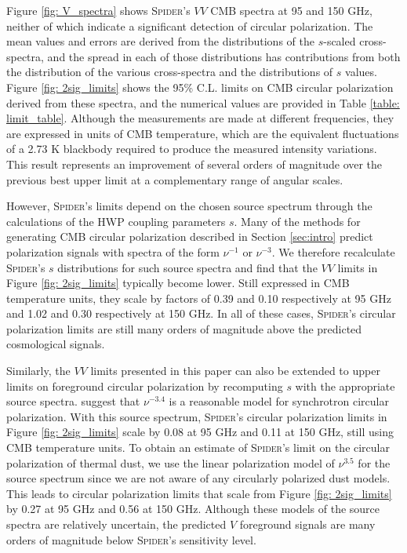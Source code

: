 \documentclass[twocolumn]{aastex61}
\begin{document}
Figure \ref{fig: V_spectra} shows \textsc{Spider}'s $VV$  CMB spectra at 95 and 150 GHz, neither of which indicate a significant detection of circular polarization.  The mean values and errors are derived from the distributions of the $s$-scaled cross-spectra, and the spread in each of those distributions has contributions from both the distribution of the various cross-spectra and the distributions of $s$ values.  Figure \ref{fig: 2sig_limits} shows the 95\% C.L. limits on CMB circular polarization derived from these spectra, and the numerical values are provided in Table \ref{table: limit_table}.  Although the measurements are made at different frequencies, they are expressed in units of CMB temperature, which are the equivalent fluctuations of a 2.73 K blackbody required to produce the measured intensity variations.  This result represents an improvement of several orders of magnitude over the previous best upper limit \citep{Mipol} at a complementary range of angular scales.  

However, \textsc{Spider}'s limits depend on the chosen source spectrum through the calculations of the HWP coupling parameters $s$.  Many of the methods for generating CMB circular polarization described in Section \ref{sec:intro} predict polarization signals with spectra of the form $\nu^{-1}$ or $\nu^{-3}$.  We therefore recalculate \textsc{Spider}'s $s$ distributions for such source spectra and find that the $VV$ limits in Figure \ref{fig: 2sig_limits} typically become lower.  Still expressed in CMB temperature units, they scale by factors of 0.39 and 0.10 respectively at 95 GHz and 1.02 and 0.30 respectively at 150 GHz.  In all of these cases, \textsc{Spider}'s circular polarization limits are still many orders of magnitude above the predicted cosmological signals. 

Similarly, the $VV$ limits presented in this paper can also be extended to upper limits on foreground circular polarization by recomputing $s$ with the appropriate source spectra.  \citet{Lubin_review} suggest that $\nu^{-3.4}$ is a reasonable model for synchrotron circular polarization.  With this source spectrum, \textsc{Spider}'s circular polarization limits in Figure \ref{fig: 2sig_limits} scale by 0.08 at 95 GHz and 0.11 at 150 GHz, still using CMB temperature units.  To obtain an estimate of \textsc{Spider}'s limit on the circular polarization of thermal dust, we use the linear polarization model of $\nu^{3.5}$ for the source spectrum \citep{planck_foregrounds} since we are not aware of any circularly polarized dust models.  This leads to circular polarization limits that scale from Figure \ref{fig: 2sig_limits} by 0.27 at 95 GHz and 0.56 at 150 GHz.  Although these models of the source spectra are relatively uncertain, the predicted $V$ foreground signals are many orders of magnitude below \textsc{Spider}'s sensitivity level.
\end{document}
